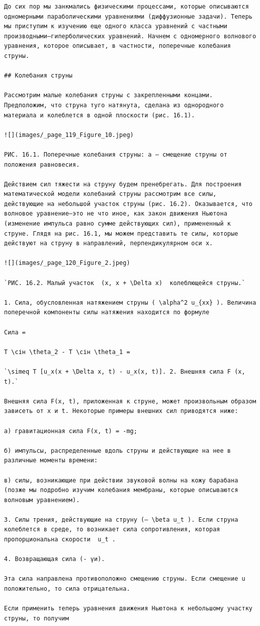 \documentclass[
  ukrainian,
]{article}
\begin{document}
\begin{verbatim}
До сих пор мы занкмались физическими процессами, которые описываются одномерными параболическими уравнениями (диффузионные задачи). Теперь мы приступим к изучению еще одного класса уравнений с частными производными—гиперболических уравнений. Начнем с одномерного волнового уравнения, которое описывает, в частности, поперечные колебания струны.

## Колебания струны

Рассмотрим малые колебания струны с закрепленными концами. Предположим, что струна туго натянута, сделана из однородного материала и колеблется в одной плоскости (рис. 16.1).

![](images/_page_119_Figure_10.jpeg)

РИС. 16.1. Поперечные колебания струны: a — смещение струны от положения равновесия.

Действием сил тяжести на струну будем пренебрегать. Для построения математической модели колебаний струны рассмотрим все силы, действующие на небольшой участок струны (рис. 16.2). Оказывается, что волновое уравнение—это не что иное, как закон движения Ньютона (изменение импульса равно сумме действующих сил), примененный к струне. Глядя на рис. 16.1, мы можем представить те силы, которые действуют на струну в направлений, перпендикулярном оси х.

![](images/_page_120_Figure_2.jpeg)

`РИС. 16.2. Малый участок  (x, x + \Delta x)  колеблющейся струны.`

1. Сила, обусловленная натяжением струны ( \alpha^2 u_{xx} ). Величина поперечной компоненты силы натяжения находится по формуле

Сила = 

Т \сін \theta_2 - Т \сін \theta_1 =

`\simeq T [u_x(x + \Delta x, t) - u_x(x, t)]. 2. Внешняя сила F (x, t).`

Внешняя сила F(x, t), приложенная к струне, может произвольным образом зависеть от x и t. Некоторые примеры внешних сил приводятся ниже:

а) гравитационная сила F(x, t) = -mg;

б) импульсы, распределенные вдоль струны и действующие на нее в различные моменты времени:

в) силы, возникающие при действии звуковой волны на кожу барабана (позже мы подробно изучим колебания мембраны, которые описываются волновым уравнением).

3. Силы трения, действующие на струну (— \beta u_t ). Если струна колеблется в среде, то возникает сила сопротивления, которая пропорциональна скорости  u_t .

4. Возвращающая сила (- үи).

Эта сила направлена противоположно смещению струны. Если смещение u положительно, то сила отрицательна.

Если применить теперь уравнения движения Ньютона к небольшому участку струны, то получим
\end{verbatim}
\end{document}
